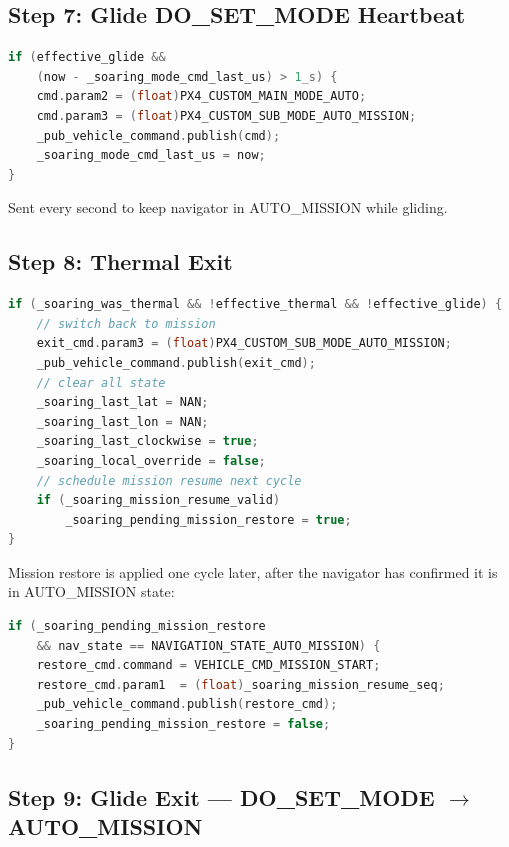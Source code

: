 \documentclass[12pt,a4paper]{article}
\begin{document}
\subsection{Step 7: Glide DO\_SET\_MODE Heartbeat}

\begin{lstlisting}[language=C++]
if (effective_glide &&
    (now - _soaring_mode_cmd_last_us) > 1_s) {
    cmd.param2 = (float)PX4_CUSTOM_MAIN_MODE_AUTO;
    cmd.param3 = (float)PX4_CUSTOM_SUB_MODE_AUTO_MISSION;
    _pub_vehicle_command.publish(cmd);
    _soaring_mode_cmd_last_us = now;
}
\end{lstlisting}

Sent every second to keep navigator in AUTO\_MISSION while gliding.

\subsection{Step 8: Thermal Exit}

\begin{lstlisting}[language=C++]
if (_soaring_was_thermal && !effective_thermal && !effective_glide) {
    // switch back to mission
    exit_cmd.param3 = (float)PX4_CUSTOM_SUB_MODE_AUTO_MISSION;
    _pub_vehicle_command.publish(exit_cmd);
    // clear all state
    _soaring_last_lat = NAN;
    _soaring_last_lon = NAN;
    _soaring_last_clockwise = true;
    _soaring_local_override = false;
    // schedule mission resume next cycle
    if (_soaring_mission_resume_valid)
        _soaring_pending_mission_restore = true;
}
\end{lstlisting}

Mission restore is applied one cycle later, after the navigator has
confirmed it is in AUTO\_MISSION state:
\begin{lstlisting}[language=C++]
if (_soaring_pending_mission_restore
    && nav_state == NAVIGATION_STATE_AUTO_MISSION) {
    restore_cmd.command = VEHICLE_CMD_MISSION_START;
    restore_cmd.param1  = (float)_soaring_mission_resume_seq;
    _pub_vehicle_command.publish(restore_cmd);
    _soaring_pending_mission_restore = false;
}
\end{lstlisting}

\subsection{Step 9: Glide Exit --- DO\_SET\_MODE $\to$ AUTO\_MISSION}
\end{document}
